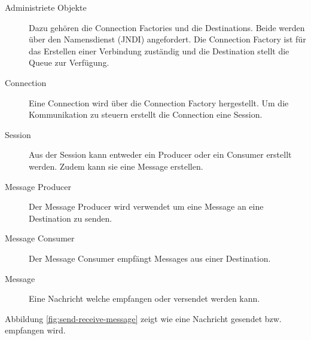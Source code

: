 \begin{description}
	\item[Administriete Objekte] Dazu gehören die Connection Factories und die Destinations. Beide werden über den Namensdienst (JNDI) angefordert. Die Connection Factory ist für das Erstellen einer Verbindung zuständig und die Destination stellt die Queue zur Verfügung.
	\item[Connection] Eine Connection wird über die Connection Factory hergestellt. Um die Kommunikation zu steuern erstellt die Connection eine Session.
	\item[Session] Aus der Session kann entweder ein Producer oder ein Consumer erstellt werden. Zudem kann sie eine Message erstellen.
	\item[Message Producer] Der Message Producer wird verwendet um eine Message an eine Destination zu senden.
	\item[Message Consumer] Der Message Consumer empfängt Messages aus einer Destination.
	\item[Message] Eine Nachricht welche empfangen oder versendet werden kann. 
\end{description}

Abbildung \ref{fig:send-receive-message} zeigt wie eine Nachricht gesendet bzw. empfangen wird.

